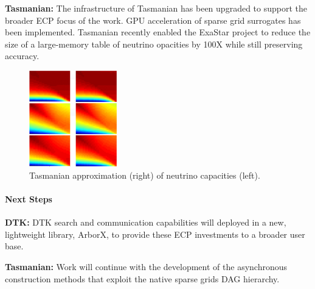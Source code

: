 {\bf Tasmanian:} The infrastructure of Tasmanian has been upgraded to support
the broader ECP focus of the work.  GPU acceleration of sparse grid surrogates
has been implemented.  Tasmanian recently enabled the ExaStar project to
reduce the size of a large-memory table of neutrino opacities by 100X while
still preserving accuracy.

\begin{figure}[htb]
        \centering
        \includegraphics[width=1.5in]{projects/2.3.3-MathLibs/2.3.3.14-ALExa-ForTrilinos/tasmanian-gpu}
        \caption{\label{fig:tasmanian-gpu}Tasmanian approximation (right) of neutrino capacities (left).}
\end{figure}


\paragraph{Next Steps}

\indent

{\bf DTK:} DTK search and communication capabilities will deployed in a new,
lightweight library, ArborX, to provide these ECP investments to a broader
user base.

{\bf Tasmanian:} Work will continue with the development of the asynchronous
construction methods that exploit the native sparse grids DAG hierarchy.

